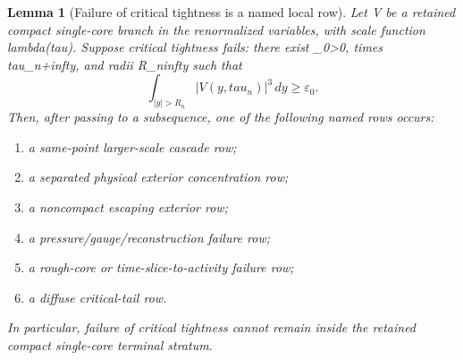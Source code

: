 \documentclass[11pt]{amsart}
\def\({}%
\def\){}%
\def\tau{tau}%
\def\lambda{lambda}%
\def\infty{infty}%
\theoremstyle{plain}
\newtheorem{lemma}[lemma]{Lemma}
\theoremstyle{definition}
\theoremstyle{remark}
\begin{document}
\begin{lemma}[Failure of critical tightness is a named local row]
\label{paper9:lem:critical-tightness-failure-row}
\label{paper6a:lem:retained-tightness-routing}
Let \(V\) be a retained compact single-core branch in the renormalized
variables, with scale function \(\lambda(\tau)\).  Suppose critical tightness
fails: there exist \(\varepsilon_0>0\), times \(\tau_n\to+\infty\), and radii
\(R_n\to\infty\) such that
\[
   \int_{|y|>R_n}|V(y,\tau_n)|^3\,dy\ge \varepsilon_0 .
\]
Then, after passing to a subsequence, one of the following named rows occurs:
\begin{enumerate}[label=\textup{(\roman*)}]
\item a same-point larger-scale cascade row;
\item a separated physical exterior concentration row;
\item a noncompact escaping exterior row;
\item a pressure/gauge/reconstruction failure row;
\item a rough-core or time-slice-to-activity failure row;
\item a diffuse critical-tail row.
\end{enumerate}
In particular, failure of critical tightness cannot remain inside the retained
compact single-core terminal stratum.
\end{lemma}
\end{document}

